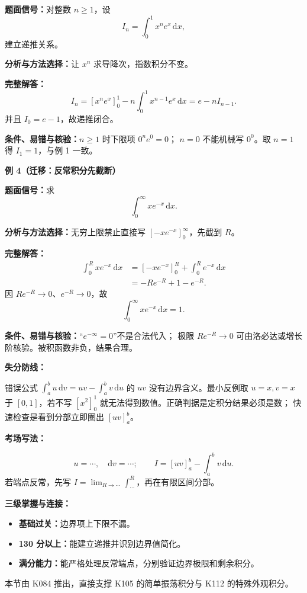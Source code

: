 \begin{knowledgeBox}
\textbf{题面信号：}对整数 \(n\ge1\)，设
\[
I_n=\int_0^1x^n e^x\,\mathrm dx,
\]
建立递推关系。

\textbf{分析与方法选择：}让 \(x^n\) 求导降次，指数积分不变。

\textbf{完整解答：}
\[
I_n=[x^ne^x]_0^1-n\int_0^1x^{n-1}e^x\,\mathrm dx
=e-nI_{n-1}.
\]
并且 \(I_0=e-1\)，故递推闭合。

\textbf{条件、易错与核验：}\(n\ge1\) 时下限项 \(0^n e^0=0\)；
\(n=0\) 不能机械写 \(0^0\)。取 \(n=1\) 得 \(I_1=1\)，与例 1 一致。

\textbf{例 4（迁移：反常积分先截断）}

\textbf{题面信号：}求
\[
\int_0^\infty xe^{-x}\,\mathrm dx.
\]

\textbf{分析与方法选择：}无穷上限禁止直接写
\([-xe^{-x}]_0^\infty\)，先截到 \(R\)。

\textbf{完整解答：}
\[
\begin{aligned}
\int_0^Rxe^{-x}\,\mathrm dx
&=[-xe^{-x}]_0^R+\int_0^Re^{-x}\,\mathrm dx\\
&=-Re^{-R}+1-e^{-R}.
\end{aligned}
\]
因 \(Re^{-R}\to0\)、\(e^{-R}\to0\)，故
\[
\boxed{\int_0^\infty xe^{-x}\,\mathrm dx=1.}
\]

\textbf{条件、易错与核验：}“\(e^{-\infty}=0\)”不是合法代入；
极限 \(Re^{-R}\to0\) 可由洛必达或增长阶核验。被积函数非负，结果合理。

\textbf{失分防线：}

错误公式 \(\int_a^b u\,\mathrm dv=uv-\int_a^bv\,\mathrm du\) 的
\(uv\) 没有边界含义。最小反例取 \(u=x,v=x\) 于 \([0,1]\)，若不写
\([x^2]_0^1\) 就无法得到数值。正确判据是定积分结果必须是数；
快速检查是看到分部立即圈出 \([uv]_a^b\)。

\textbf{考场写法：}

\[
u=\cdots,\quad\mathrm dv=\cdots;\qquad
I=[uv]_a^b-\int_a^bv\,\mathrm du.
\]
若端点反常，先写 \(I=\lim_{R\to\cdots}\int_{\cdots}^{R}\)，再在有限区间分部。

\textbf{三级掌握与连接：}
\begin{itemize}
  \item \textbf{基础过关：}边界项上下限不漏。
  \item \textbf{130 分以上：}能建立递推并识别边界值简化。
  \item \textbf{满分能力：}能严格处理反常端点，分别验证边界极限和剩余积分。
\end{itemize}
本节由 K084 推出，直接支撑 K105 的简单振荡积分与 K112 的特殊外观积分。
\end{knowledgeBox}

